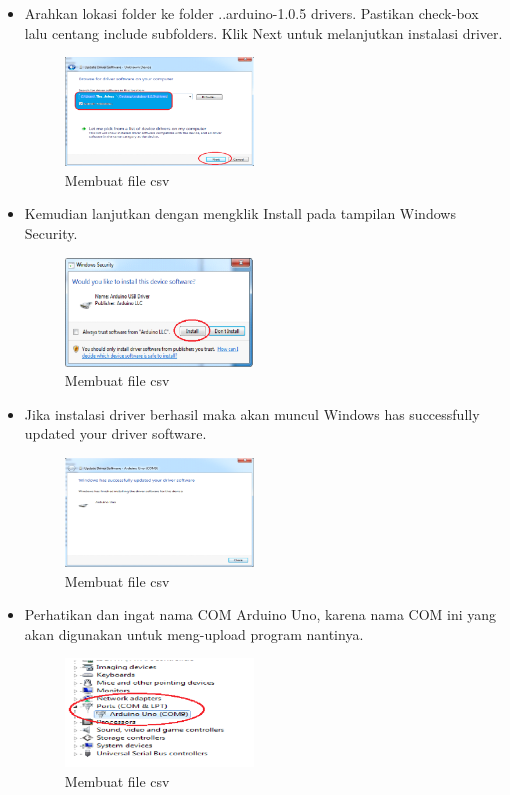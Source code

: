 \begin{enumerate}
\begin{itemize}
\item Arahkan lokasi folder ke folder ..arduino-1.0.5 drivers. Pastikan check-box lalu centang include subfolders. Klik Next untuk melanjutkan instalasi driver.
\begin{figure}[H] 
\includegraphics[width=5cm]{figures/5/Teori/1174038/8.png}
\centering
\caption{Membuat file csv}
\end{figure}

\item Kemudian lanjutkan dengan mengklik Install pada tampilan Windows Security.
\begin{figure}[H] 
\includegraphics[width=5cm]{figures/5/Teori/1174038/9.png}
\centering
\caption{Membuat file csv}
\end{figure}

\item Jika instalasi driver berhasil maka akan muncul Windows has successfully updated your driver software.
\begin{figure}[H] 
\includegraphics[width=5cm]{figures/5/Teori/1174038/10.png}
\centering
\caption{Membuat file csv}
\end{figure}

\item Perhatikan dan ingat nama COM Arduino Uno, karena nama COM ini yang akan digunakan untuk meng-upload program nantinya.
\begin{figure}[H] 
\includegraphics[width=5cm]{figures/5/Teori/1174038/11.png}
\centering
\caption{Membuat file csv}
\end{figure}
\end{itemize}
\end{enumerate}
